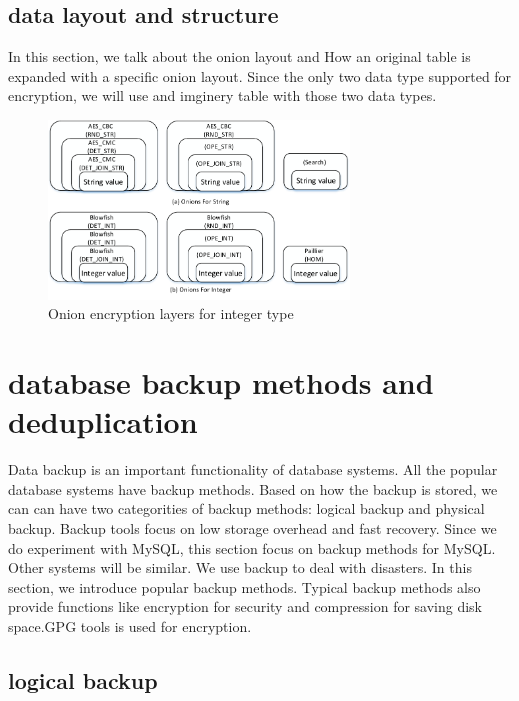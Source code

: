 \subsection{data layout and structure}

In this section, we talk about the onion layout and How an original table is expanded with a specific onion layout. Since the only two data type supported for encryption, we will use and imginery table with those two data types. 



\begin{figure}[tb]
\centering
\includegraphics[width=8cm]{images/Onions.pdf}
\caption{Onion encryption layers for integer type}
\label{fig:stack3}
\end{figure}


\section{database backup methods and deduplication}

Data backup is an important functionality of database systems. All the popular database systems have backup methods. Based on how the backup is stored, we can can have two categorities of backup methods: logical backup and physical backup. Backup tools focus on low storage overhead and fast recovery. Since we do experiment with MySQL, this section focus on backup methods for MySQL. Other systems will be similar. We use backup to deal with disasters. In this section, we introduce popular backup methods. Typical backup methods also provide functions like encryption for security and compression for saving disk space.GPG tools is used for encryption.



\subsection{logical backup}

